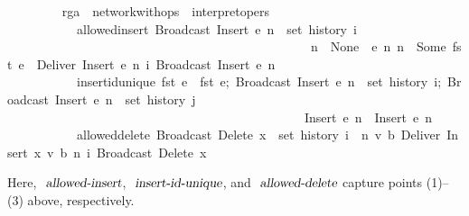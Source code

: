 \documentclass[acmlarge,review,anonymous]{acmart}\settopmatter{printfolios=true}
\begin{document}
\begin{isabellebody} %
\ \ \ \ \ \ \ \  rga\ {\isacharequal}\ network{\isacharunderscore}with{\isacharunderscore}ops\ {\isacharunderscore}\ interpret{\isacharunderscore}opers\ {\isacharplus}\isanewline
\ \ \ \ \ \ \ \ \ \ \ allowed{\isacharunderscore}insert{\isacharcolon}\ {\isachardoublequoteopen}Broadcast\ {\isacharparenleft}Insert\ e\ n{\isacharparenright}\ {\isasymin}\ set\ {\isacharparenleft}history\ i{\isacharparenright}\ {\isasymLongrightarrow}\ \isanewline
\ \ \ \ \ \ \ \ \ \ \ \ \ \ \ \ \ \ \ \ \ \ \ \ \ \ \ \ \ \ \ \ \ \ \ \ \ \ \ \ \ \ \ \ \ \ \ \ n\ {\isacharequal}\ None\ {\isasymor}\ {\isacharparenleft}{\isasymexists}e{\isacharprime}\ n{\isacharprime}{\isachardot}\ n\ {\isacharequal}\ Some\ {\isacharparenleft}fst\ e{\isacharprime}{\isacharparenright}\ {\isasymand}\ Deliver\ {\isacharparenleft}Insert\ e{\isacharprime}\ n{\isacharprime}{\isacharparenright}\ {\isasymsqsubset}\isactrlsup i\ Broadcast\ {\isacharparenleft}Insert\ e\ n{\isacharparenright}{\isacharparenright}{\isachardoublequoteclose}\isanewline
\ \ \ \ \ \ \ \ \ \ \ insert{\isacharunderscore}id{\isacharunderscore}unique{\isacharcolon}\ {\isachardoublequoteopen}{\isasymlbrakk}fst\ e{}\ {\isacharequal}\ fst\ e{};\ Broadcast\ {\isacharparenleft}Insert\ e{}\ n{}{\isacharparenright}\ {\isasymin}\ set\ {\isacharparenleft}history\ i{\isacharparenright};\ Broadcast\ {\isacharparenleft}Insert\ e{}\ n{}{\isacharparenright}\ {\isasymin}\ set\ {\isacharparenleft}history\ j{\isacharparenright}{\isasymrbrakk}\ {\isasymLongrightarrow}\isanewline
\ \ \ \ \ \ \ \ \ \ \ \ \ \ \ \ \ \ \ \ \ \ \ \ \ \ \ \ \ \ \ \ \ \ \ \ \ \ \ \ \ \ \ \ \ \ \ Insert\ e{}\ n{}\ {\isacharequal}\ Insert\ e{}\ n{}{\isachardoublequoteclose}\isanewline
\ \ \ \ \ \ \ \ \ \ \ allowed{\isacharunderscore}delete{\isacharcolon}\ {\isachardoublequoteopen}Broadcast\ {\isacharparenleft}Delete\ x{\isacharparenright}\ {\isasymin}\ set\ {\isacharparenleft}history\ i{\isacharparenright}\ {\isasymLongrightarrow}\ {\isacharparenleft}{\isasymexists}n{\isacharprime}\ v\ b{\isachardot}\ Deliver\ {\isacharparenleft}Insert\ {\isacharparenleft}x{\isacharcomma}\ v{\isacharcomma}\ b{\isacharparenright}\ n{\isacharprime}{\isacharparenright}\ {\isasymsqsubset}\isactrlsup i\ Broadcast\ {\isacharparenleft}Delete\ x{\isacharparenright}{\isacharparenright}{\isachardoublequoteclose}
\end{isabellebody}
\vspace{\baselineskip}
\noindent
Here, $\isa{allowed-insert}$, $\isa{insert-id-unique}$, and $\isa{allowed-delete}$ capture points (1)--(3) above, respectively.
\end{document}
